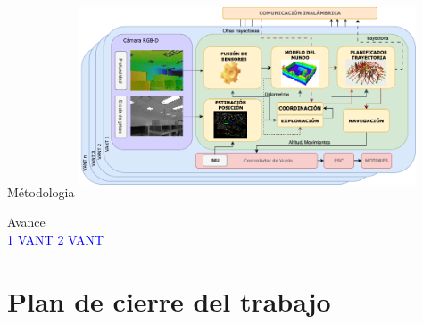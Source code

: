 \documentclass[24pt,aspectratio=169]{beamer}
\begin{document}
\begin{frame}{Métodologia}
  \centering
  \includegraphics[width=10cm, height=6cm]{arquitectura}
\end{frame}

\begin{frame}{Avance}
  \bigskip %
  \centering
  \hfil
  \vspace{2pt}\\
  \textcolor{blue}{1 VANT}
  \hfil
  \textcolor{blue}{2 VANT}
\end{frame}


\section{Plan de cierre del trabajo}
\end{document}
